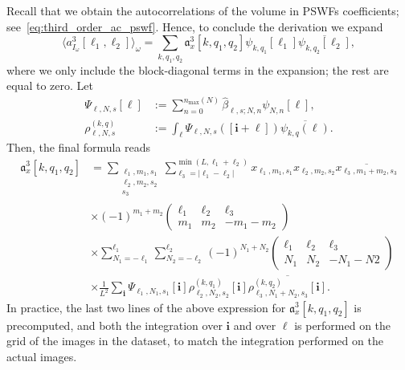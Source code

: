 \documentclass[12pt]{article}
\newcommand{\1}{\mathbf{1}}
\newcommand{\mb}{\mathbf}
\newcommand*\Bell{\ensuremath{\boldsymbol\ell}}
\newcommand{\tamir}{x}
\theoremstyle{plain}
\theoremstyle{definition}
\theoremstyle{remark}
\theoremstyle{plain}
\theoremstyle{remark}
\theoremstyle{plain}
\theoremstyle{plain}
\begin{document}
Recall that we obtain the autocorrelations of the volume in PSWFs coefficients; see~\eqref{eq:third_order_ac_pswf}. Hence, to conclude the derivation we expand
\[ \langle a^3_{I_{\omega}}[\Bell_1, \Bell_2]\rangle_{\omega}= \sum_{k,q_1,q_2}\mathfrak{a}_x^3[k,q_1,q_2]\psi_{k,q_1}[\Bell_1]\overline{\psi_{k,q_2}[\Bell_2]},\]
where we only include the block-diagonal terms in the expansion; the rest are equal to zero. Let
\begin{align*}
\Psi_{\ell,N,s}[\Bell] &:= \sum_{n=0}^{n_{\text{max}}(N)}\widehat\beta_{\ell,s;N,n}\psi_{N,n}[\Bell],\\ 
\rho_{\ell,N,s}^{(k,q)}&:=\int_{\Bell}\Psi_{\ell,N,s}([\mb i+\Bell])\overline{\psi_{k,q}(\Bell)}.
\end{align*}
Then, 
the final formula reads
\begin{align} \label{eq:ac_3_prolates}
\mathfrak{a}_x^3[k,q_1,q_2] &= \sum_{\substack{\ell_1,m_1,s_1\nonumber \\ \ell_2,m_2,s_2\\s_3}}\sum_{\ell_3=|\ell_1-\ell_2|}^{\min(L,\ell_1+\ell_2)}\tamir_{\ell_1,m_1,s_1}\tamir_{\ell_2,m_2,s_2}\overline{\tamir_{\ell_3,m_1+m_2,s_3}}\\
&\times (-1)^{m_1+m_2}\left(\begin{array}{ccc}\ell_1 & \ell_2  & \ell_3\\ m_1 & m_2 & -m_1-m_2\end{array}\right)\\
&\times \sum_{N_1=-\ell_1}^{\ell_1}\sum_{N_2=-\ell_2}^{\ell_2}(-1)^{N_1+N_2}\left(\begin{array}{ccc}\ell_1 & \ell_2  & \ell_3\nonumber\\ N_1 & N_2 & -N_1-N2\end{array}\right)\nonumber\\&\times\frac{1}{L^2}\sum_{\mb i}\Psi_{\ell_1,N_1,s_1}[\mb i]\rho_{\ell_2,N_2,s_2}^{(k,q_1)}[\mb i]\overline{\rho_{\ell_3,N_1+N_2,s_3}^{(k,q_2)}[\mb i]}. \nonumber
\end{align}
In practice, the last two lines of the above expression for $\mathfrak{a}_x^3[k,q_1,q_2]$ is precomputed, and both the integration over $\mb i$ and over $\Bell$ is performed on the grid of the images in the dataset, to match the integration performed on the actual images.
\end{document}
